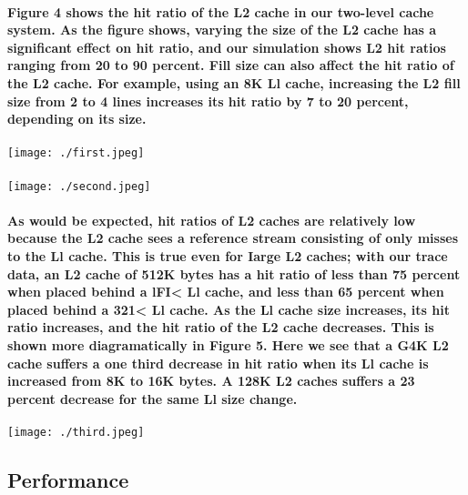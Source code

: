 \documentclass{article}
\begin{document}
\paragraph{Figure 4 shows the hit ratio of the L2 cache in 
 our two-level cache system. As the figure shows, varying the
 size of the L2 cache has a significant effect on hit ratio, and our 
 simulation shows L2 hit ratios ranging from 20 to 90 percent. Fill size can
  also affect the hit ratio of the L2 cache. For example, using an 8K Ll cache, 
  increasing the L2 fill size from 2 to 4 lines increases its hit ratio by 7 to 20 percent, depending on its size. }
 \paragraph{}
\texttt{[image: ./first.jpeg]}
\paragraph{}
\texttt{[image: ./second.jpeg]}

\paragraph{As would be expected, hit ratios of L2 caches are relatively low because 
the L2 cache sees a reference stream consisting of only misses to the Ll cache. 
This is true even for Iarge L2 caches; with our trace data, an L2 cache of 512K 
bytes has a hit ratio of less than 75 percent when placed behind a lFI< Ll cache, 
and less than 65 percent when placed behind a 321< Ll cache. As the Ll cache size 
increases, its hit ratio increases, and the hit ratio of the L2 cache decreases. 
This is shown more diagramatically in Figure 5. Here we see that a G4K L2 cache suffers
 a one third decrease in hit ratio when its Ll cache is increased from 8K to 16K bytes. 
 A 128K L2 caches suffers a 23 percent decrease for the same Ll size change. }

\texttt{[image: ./third.jpeg]}

\subsection{Performance}
\end{document}
